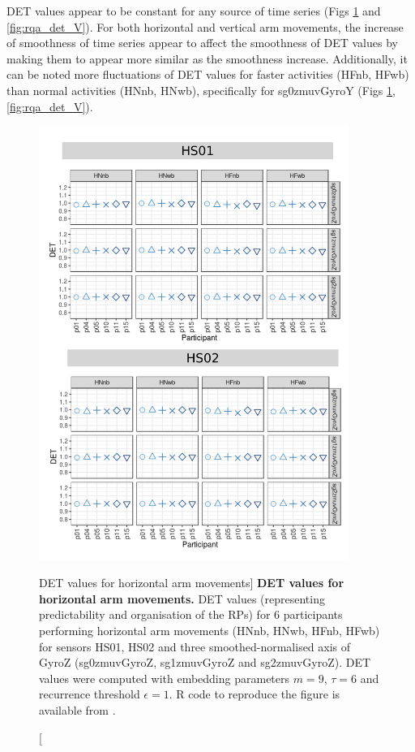 DET values appear to be constant for any source of time series 
(Figs \ref{fig:rqa_det_H} and \ref{fig:rqa_det_V}).
For both horizontal and vertical arm movements, the increase of smoothness 
of time series appear to affect the smoothness of DET values by making them 
to appear more similar as the smoothness increase.
Additionally, it can be noted more fluctuations of DET values 
for faster activities (HFnb, HFwb) 
than normal activities (HNnb, HNwb), specifically for  sg0zmuvGyroY 
(Figs \ref{fig:rqa_det_H}, \ref{fig:rqa_det_V}).




\begin{figure}
\centering
\includegraphics[width=0.9\textwidth]{rqa_det_H_w500}
    \caption
	[DET values for horizontal arm movements]{
	{\bf DET values for horizontal arm movements.}	
    	DET values (representing predictability and organisation of the RPs)
	for 6 participants performing horizontal arm movements 
	(HNnb, HNwb, HFnb, HFwb)
	for sensors HS01, HS02 and three smoothed-normalised axis 
	of GyroZ (sg0zmuvGyroZ, sg1zmuvGyroZ and sg2zmuvGyroZ).
	DET values were computed with 
	embedding parameters $m=9$, $\tau=6$ and recurrence threshold
	$\epsilon=1$.
	R code to reproduce the figure is available from \cite{hwum2018}.
        }
    \label{fig:rqa_det_H}
\end{figure}
